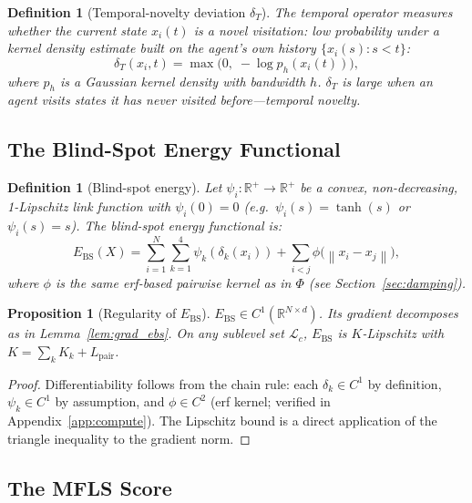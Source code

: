 \documentclass[11pt]{article}
\newtheorem{proposition}[theorem]{Proposition}
\newtheorem{definition}[theorem]{Definition}
\theoremstyle{definition}
\newcommand{\R}{\mathbb{R}}
\newcommand{\Ebs}{E_{\mathrm{BS}}}
\newcommand{\Lpair}{L_{\mathrm{pair}}}
\newcommand{\norm}[1]{\left\|#1\right\|}
\begin{document}
\begin{definition}[Temporal-novelty deviation $\delta_T$]
The temporal operator measures whether the current state $x_i(t)$ is a novel
visitation: low probability under a kernel density estimate built on the agent's
own history $\{x_i(s) : s < t\}$:
\[
  \delta_T(x_i, t) = \max\bigl(0,\; -\log p_h(x_i(t))\bigr),
\]
where $p_h$ is a Gaussian kernel density with bandwidth $h$.  $\delta_T$ is large
when an agent visits states it has never visited before---temporal novelty.
\end{definition}

\subsection{The Blind-Spot Energy Functional}

\begin{definition}[Blind-spot energy]
\label{def:ebs}
Let $\psi_i : \R^+ \to \R^+$ be a convex, non-decreasing, 1-Lipschitz link
function with $\psi_i(0) = 0$ (e.g.\ $\psi_i(s) = \tanh(s)$ or $\psi_i(s) = s$).
The blind-spot energy functional is:
\begin{equation}\label{eq:ebs}
  \Ebs(X) = \sum_{i=1}^{N}\sum_{k=1}^{4}\psi_k(\delta_k(x_i))
             + \sum_{i < j}\phi\bigl(\norm{x_i - x_j}\bigr),
\end{equation}
where $\phi$ is the same erf-based pairwise kernel as in $\Phi$ (see
Section~\ref{sec:damping}).
\end{definition}

\begin{proposition}[Regularity of $\Ebs$]
\label{prop:ebs_reg}
$\Ebs \in C^1(\R^{N \times d})$.  Its gradient decomposes as in
Lemma~\ref{lem:grad_ebs}.  On any sublevel set $\mathcal{L}_c$,
$\Ebs$ is $K$-Lipschitz with $K = \sum_k K_k + \Lpair$.
\end{proposition}

\begin{proof}
Differentiability follows from the chain rule: each $\delta_k \in C^1$ by
definition, $\psi_k \in C^1$ by assumption, and $\phi \in C^2$ (erf kernel;
verified in Appendix~\ref{app:compute}).  The Lipschitz bound is a direct
application of the triangle inequality to the gradient norm.
\end{proof}

\subsection{The MFLS Score}
\end{document}
